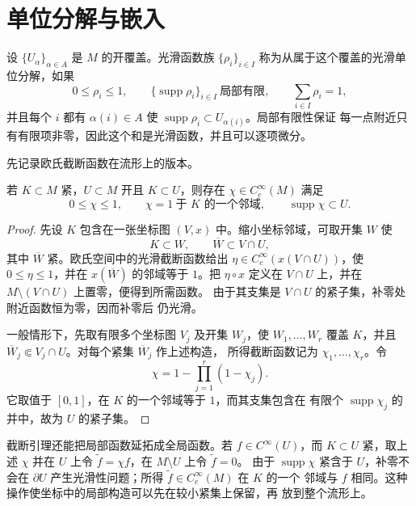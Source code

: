 \section{单位分解与嵌入}

设 \(\{U_\alpha\}_{\alpha\in A}\) 是 \(M\) 的开覆盖。光滑函数族
\(\{\rho_i\}_{i\in I}\) 称为从属于这个覆盖的光滑单位分解，如果
\[
 0\le\rho_i\le1,\qquad
 \{\operatorname{supp}\rho_i\}_{i\in I}\ \text{局部有限},\qquad
 \sum_{i\in I}\rho_i=1,
\]
并且每个 \(i\) 都有 \(\alpha(i)\in A\) 使
\(\operatorname{supp}\rho_i\subset U_{\alpha(i)}\)。局部有限性保证
每一点附近只有有限项非零，因此这个和是光滑函数，并且可以逐项微分。

先记录欧氏截断函数在流形上的版本。

\begin{lemma}[光滑截断]\label{lem:manifold-smooth-cutoff}
若 \(K\subset M\) 紧，\(U\subset M\) 开且 \(K\subset U\)，则存在
\(\chi\in C_c^\infty(M)\) 满足
\[
 0\le\chi\le1,\qquad
 \chi=1\ \text{于 \(K\) 的一个邻域},\qquad
 \operatorname{supp}\chi\subset U.
\]
\end{lemma}

\begin{proof}
先设 \(K\) 包含在一张坐标图 \((V,x)\) 中。缩小坐标邻域，可取开集
\(W\) 使
\[
 K\subset W,\qquad \overline W\subset V\cap U,
\]
其中 \(\overline W\) 紧。欧氏空间中的光滑截断函数给出
\(\eta\in C_c^\infty(x(V\cap U))\)，使 \(0\le\eta\le1\)，并在
\(x(\overline W)\) 的邻域等于 \(1\)。把 \(\eta\circ x\) 定义在
\(V\cap U\) 上，并在 \(M\setminus(V\cap U)\) 上置零，便得到所需函数。
由于其支集是 \(V\cap U\) 的紧子集，补零处附近函数恒为零，因而补零后
仍光滑。

一般情形下，先取有限多个坐标图 \(V_j\) 及开集 \(W_j\)，使
\(W_1,\ldots,W_r\) 覆盖 \(K\)，并且
\(\overline W_j\Subset V_j\cap U\)。对每个紧集 \(\overline W_j\) 作上述构造，
所得截断函数记为 \(\chi_1,\ldots,\chi_r\)。令
\[
 \chi=1-\prod_{j=1}^r(1-\chi_j).
\]
它取值于 \([0,1]\)，在 \(K\) 的一个邻域等于 \(1\)，而其支集包含在
有限个 \(\operatorname{supp}\chi_j\) 的并中，故为 \(U\) 的紧子集。
\end{proof}

截断引理还能把局部函数延拓成全局函数。若 \(f\in C^\infty(U)\)，而
\(K\subset U\) 紧，取上述 \(\chi\) 并在 \(U\) 上令
\(\widetilde f=\chi f\)，在 \(M\setminus U\) 上令 \(\widetilde f=0\)。
由于 \(\operatorname{supp}\chi\) 紧含于 \(U\)，补零不会在 \(\partial U\)
产生光滑性问题；所得 \(\widetilde f\in C_c^\infty(M)\) 在 \(K\) 的一个
邻域与 \(f\) 相同。这种操作使坐标中的局部构造可以先在较小紧集上保留，再
放到整个流形上。

